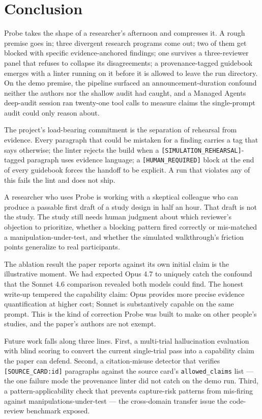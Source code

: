 \section{Conclusion}
\label{sec:conclusion}

Probe takes the shape of a researcher's afternoon and compresses it. A rough premise goes in; three divergent research programs come out; two of them get blocked with specific evidence-anchored findings; one survives a three-reviewer panel that refuses to collapse its disagreements; a provenance-tagged guidebook emerges with a linter running on it before it is allowed to leave the run directory. On the demo premise, the pipeline surfaced an announcement-duration confound neither the authors nor the shallow audit had caught, and a Managed Agents deep-audit session ran twenty-one tool calls to measure claims the single-prompt audit could only reason about.

The project's load-bearing commitment is the separation of rehearsal from evidence. Every paragraph that could be mistaken for a finding carries a tag that says otherwise; the linter rejects the build when a \texttt{[SIMULATION\_REHEARSAL]}-tagged paragraph uses evidence language; a \texttt{[HUMAN\_REQUIRED]} block at the end of every guidebook forces the handoff to be explicit. A run that violates any of this fails the lint and does not ship.

A researcher who uses Probe is working with a skeptical colleague who can produce a passable first draft of a study design in half an hour. That draft is not the study. The study still needs human judgment about which reviewer's objection to prioritize, whether a blocking pattern fired correctly or mis-matched a manipulation-under-test, and whether the simulated walkthrough's friction points generalize to real participants.

The ablation result the paper reports against its own initial claim is the illustrative moment. We had expected Opus 4.7 to uniquely catch the confound that the Sonnet 4.6 comparison revealed both models could find. The honest write-up tempered the capability claim: Opus provides more precise evidence quantification at higher cost; Sonnet is substantively capable on the same prompt. This is the kind of correction Probe was built to make on other people's studies, and the paper's authors are not exempt.

Future work falls along three lines. First, a multi-trial hallucination evaluation with blind scoring to convert the current single-trial pass into a capability claim the paper can defend. Second, a citation-misuse detector that verifies \texttt{[SOURCE\_CARD:id]} paragraphs against the source card's \texttt{allowed\_claims} list --- the one failure mode the provenance linter did not catch on the demo run. Third, a pattern-applicability check that prevents capture-risk patterns from mis-firing against manipulations-under-test --- the cross-domain transfer issue the code-review benchmark exposed.

